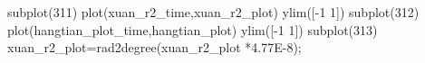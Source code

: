 subplot(311)
plot(xuan_r2_time,xuan_r2_plot)
ylim([-1 1])
subplot(312)
plot(hangtian_plot_time,hangtian_plot)
ylim([-1 1])
subplot(313)
xuan_r2_plot=rad2degree(xuan_r2_plot *4.77E-8);